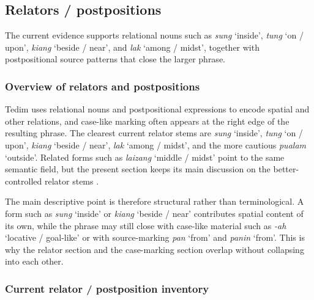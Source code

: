 \documentclass[
  11pt,
  a4paper,
]{article}
\newcommand{\tdim}[1]{\textit{#1}}
\newcommand{\glossquote}[1]{`#1'}
\begin{document}
\subsection{Relators / postpositions}\label{relators-postpositions}

The current evidence supports relational nouns such as \tdim{sung}
\glossquote{inside}, \tdim{tung} \glossquote{on / upon}, \tdim{kiang}
\glossquote{beside / near}, and \tdim{lak} \glossquote{among / midst},
together with postpositional source patterns that close the larger
phrase.

\subsubsection{Overview of relators and
postpositions}\label{overview-of-relators-and-postpositions}

Tedim uses relational nouns and postpositional expressions to encode
spatial and other relations, and case-like marking often appears at the
right edge of the resulting phrase. The clearest current relator stems
are \tdim{sung} \glossquote{inside}, \tdim{tung} \glossquote{on / upon},
\tdim{kiang} \glossquote{beside / near}, \tdim{lak}
\glossquote{among / midst}, and the more cautious \tdim{pualam}
\glossquote{outside}. Related forms such as \tdim{laizang}
\glossquote{middle / midst} point to the same semantic field, but the
present section keeps its main discussion on the better-controlled
relator stems \citep{henderson1965, zamngaihcing2017}.

The main descriptive point is therefore structural rather than
terminological. A form such as \tdim{sung} \glossquote{inside} or
\tdim{kiang} \glossquote{beside / near} contributes spatial content of
its own, while the phrase may still close with case-like material such
as \tdim{-ah} \glossquote{locative / goal-like} or with source-marking
\tdim{pan} \glossquote{from} and \tdim{panin} \glossquote{from}. This is
why the relator section and the case-marking section overlap without
collapsing into each other.

\subsubsection{Current relator / postposition
inventory}\label{current-relator-postposition-inventory}
\end{document}
